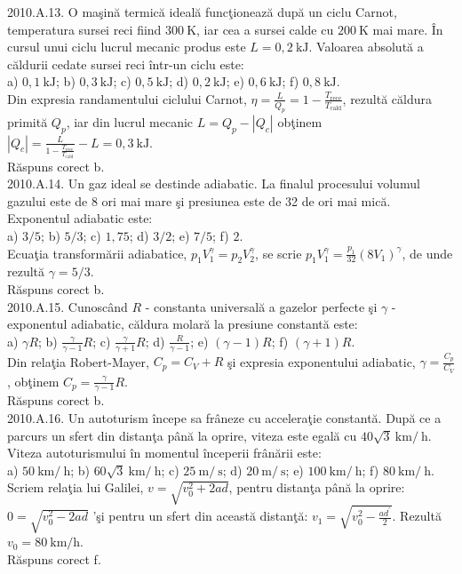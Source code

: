 2010.A.13. O maşină termică ideală funcţionează după un ciclu Carnot, temperatura sursei reci fiind $300 \mathrm{~K}$, iar cea a sursei calde cu $200 \mathrm{~K}$ mai mare. În cursul unui ciclu lucrul mecanic produs este $L=0,2 \mathrm{~kJ}$. Valoarea absolută a căldurii cedate sursei reci într-un ciclu este:\\ a) $0,1 \mathrm{~kJ}$; b) $0,3 \mathrm{~kJ}$; c) $0,5 \mathrm{~kJ}$; d) $0,2 \mathrm{~kJ}$; e) $0,6 \mathrm{~kJ}$; f) $0,8 \mathrm{~kJ}$.\\ Din expresia randamentului ciclului Carnot, $\eta=\frac{L}{Q_{p}}=1-\frac{T_{\text {rece}}}{T_{\text {cald}}}$, rezultă căldura primită $Q_{p}$, iar din lucrul mecanic $L=Q_{p}-\left|Q_{c}\right|$ obţinem $\left|Q_{c}\right|=\frac{L}{1-\frac{T_{\text {rece}}}{T_{\text {cald}}}}-L=0,3 \mathrm{~kJ}$.\\ Răspuns corect b.\\

2010.A.14. Un gaz ideal se destinde adiabatic. La finalul procesului volumul gazului este de 8 ori mai mare şi presiunea este de 32 de ori mai mică. Exponentul adiabatic este:\\ a) $3 / 5$; b) $5 / 3$; c) $1,75$; d) $3 / 2$; e) $7 / 5$; f) $2$.\\ Ecuaţia transformării adiabatice, $p_{1} V_{1}^{\gamma}=p_{2} V_{2}^{\gamma}$, se scrie $p_{1} V_{1}^{\gamma}=\frac{p_{1}}{32}\left(8 V_{1}\right)^{\gamma}$, de unde rezultă $\gamma=5 / 3$.\\ Răspuns corect b.\\

2010.A.15. Cunoscând $R$ - constanta universală a gazelor perfecte şi $\gamma$ - exponentul adiabatic, căldura molară la presiune constantă este:\\ a) $\gamma R$; b) $\frac{\gamma}{\gamma-1} R$; c) $\frac{\gamma}{\gamma+1} R$; d) $\frac{R}{\gamma-1}$; e) $(\gamma-1) R$; f) $(\gamma+1) R$.\\ Din relaţia Robert-Mayer, $C_{p}=C_{V}+R$ şi expresia exponentului adiabatic, $\gamma=\frac{C_{p}}{C_{V}}$, obţinem $C_{p}=\frac{\gamma}{\gamma-1} R$.\\ Răspuns corect b.\\

2010.A.16. Un autoturism începe sa frâneze cu acceleraţie constantă. După ce a parcurs un sfert din distanţa până la oprire, viteza este egală cu $40 \sqrt{3} \mathrm{~km} / \mathrm{~h}$. Viteza autoturismului în momentul începerii frânării este:\\ a) $50 \mathrm{~km} / \mathrm{~h}$; b) $60 \sqrt{3} \mathrm{~km} / \mathrm{~h}$; c) $25 \mathrm{~m} / \mathrm{~s}$; d) $20 \mathrm{~m} / \mathrm{~s}$; e) $100 \mathrm{~km} / \mathrm{~h}$; f) $80 \mathrm{~km} / \mathrm{~h}$.\\ Scriem relaţia lui Galilei, $v=\sqrt{v_{0}^{2}+2 a d}$, pentru distanţa până la oprire: $0=\sqrt{v_{0}^{2}-2 a d}$ 'şi pentru un sfert din această distanţă: $v_{1}=\sqrt{v_{0}^{2}-\frac{a d^{\prime}}{2}}$. Rezultă $v_{0}=80 \mathrm{~km} / \mathrm{h}$.\\ Răspuns corect f.\\

